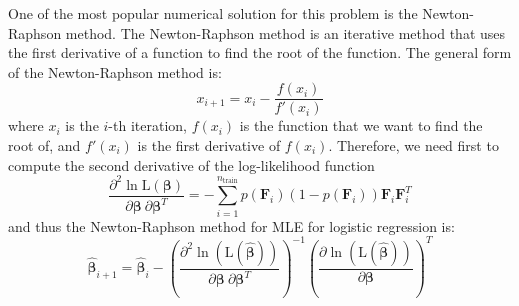 \documentclass[conf]{new-aiaa}
\begin{document}
One of the most popular numerical solution for this problem is the Newton-Raphson method. The Newton-Raphson method is an iterative method that uses the first derivative of a function to find the root of the function. The general form of the Newton-Raphson method is:
\begin{equation} \label{eq:newraph}
    x_{i+1} = x_i - \frac{f(x_i)}{f'(x_i)}
\end{equation}
where $x_i$ is the $i$-th iteration, $f(x_i)$ is the function that we want to find the root of, and $f'(x_i)$ is the first derivative of $f(x_i)$. Therefore, we need first to compute the second derivative of the log-likelihood function
\begin{equation} \label{eq:logregloglikederder}
    \frac{\partial^2 \ln \textrm{L}(\boldsymbol{\beta})}{\partial \boldsymbol{\beta}\ \partial \boldsymbol{\beta}^T} = - \sum_{i=1}^{n_\textrm{train}} p\left(\textbf{F}_i\right) \left(1 - p\left(\textbf{F}_i\right)\right) \textbf{F}_i \textbf{F}_i^T
\end{equation}
and thus the Newton-Raphson method for MLE for logistic regression is:
\begin{equation} \label{eq:logregnewraph}
\boldsymbol{\hat{\beta}}_{i+1} = \boldsymbol{\hat{\beta}}_i - \left(\frac{\partial^2 \ln \left(\textrm{L}(\boldsymbol{\hat{\beta}})\right)}{\partial \boldsymbol{\beta}\ \partial \boldsymbol{\beta}^T}\right)^{-1} \left(\frac{\partial \ln \left(\textrm{L}(\boldsymbol{\hat{\beta}})\right)}{\partial \boldsymbol{\beta}}\right)^T
\end{equation}
\end{document}
